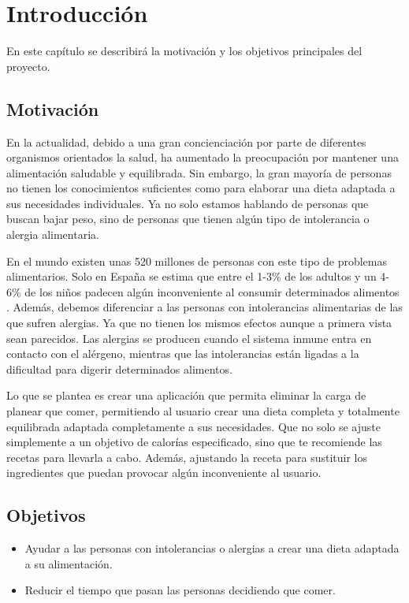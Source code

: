 \chapter{Introducción}
En este capítulo se describirá la motivación y los objetivos principales del proyecto.

\section{Motivación}
En la actualidad, debido a una gran concienciación por parte de diferentes organismos orientados la salud, ha aumentado la preocupación por mantener una alimentación saludable y equilibrada. Sin embargo, la gran mayoría de personas no tienen los conocimientos suficientes como para elaborar una dieta adaptada a sus necesidades individuales. Ya no solo estamos hablando de personas que buscan bajar peso, sino de personas que tienen algún tipo de intolerancia o alergia alimentaria. 

 En el mundo existen unas 520 millones de personas con este tipo de problemas alimentarios. Solo en España se estima que entre el 1-3\% de los adultos y un 4-6\% de los niños padecen algún inconveniente al consumir determinados alimentos \cite{alimentacion}. Además, debemos diferenciar a las personas con intolerancias alimentarias de las que sufren alergias. Ya que no tienen los mismos efectos aunque a primera vista sean parecidos. Las alergias se producen cuando el sistema inmune entra en contacto con el alérgeno, mientras que las intolerancias están ligadas a la dificultad para digerir determinados alimentos.

Lo que se plantea es crear una aplicación que permita eliminar la carga de planear que comer, permitiendo al usuario crear una dieta completa y totalmente equilibrada adaptada completamente a sus necesidades. Que no solo se ajuste simplemente a un objetivo de calorías especificado, sino que te recomiende las recetas para llevarla a cabo. Además, ajustando la receta para sustituir los ingredientes que puedan provocar algún inconveniente al usuario.

\section{Objetivos}
\begin{itemize}
    \item Ayudar a las personas con intolerancias o alergias a crear una dieta adaptada a su alimentación.
    
    \item Reducir el tiempo que pasan las personas decidiendo que comer. 
\end{itemize}